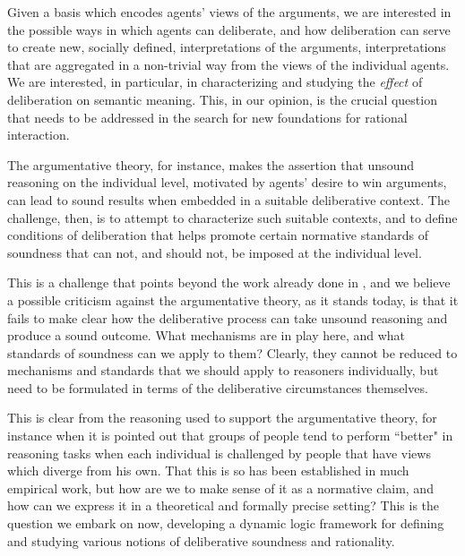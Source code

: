 \documentclass{article}
\begin{document}
Given a basis which encodes agents' views of the arguments, we are interested in the possible ways in which agents can deliberate, and how deliberation can serve to create new, socially defined, interpretations of the arguments, interpretations that are aggregated in a non-trivial way from the views of the individual agents.  We are interested, in particular, in characterizing and studying the \emph{effect} of deliberation on semantic meaning. This, in our opinion, is the crucial question that needs to be addressed in the search for new foundations for rational interaction.

The argumentative theory, for instance, makes the assertion that unsound reasoning on the individual level, motivated by agents' desire to win arguments, can lead to sound results when embedded in a suitable deliberative context. The challenge, then, is to attempt to characterize such suitable contexts, and to define conditions of deliberation that helps promote certain normative standards of soundness that can not, and should not, be imposed at the individual level. 

This is a challenge that points beyond the work already done in \cite{whyreason}, and we believe a possible criticism against the argumentative theory, as it stands today, is that it fails to make clear how the deliberative process can take unsound reasoning and produce a sound outcome.  What mechanisms are in play here, and what standards of soundness can we apply to them? Clearly, they cannot be reduced to mechanisms and standards that we should apply to reasoners individually, but need to be formulated in terms of the deliberative circumstances themselves.

This is clear from the reasoning used to support the argumentative theory, for instance when it is pointed out that groups of people tend to perform ``better" in reasoning tasks when each individual is challenged by people that have views which diverge from his own. That this is so has been established in much empirical work, but how are we to make sense of it as a normative claim, and how can we express it in a theoretical and formally precise setting? This is the question we embark on now, developing a dynamic logic framework for defining and studying various notions of deliberative soundness and rationality.
\end{document}

